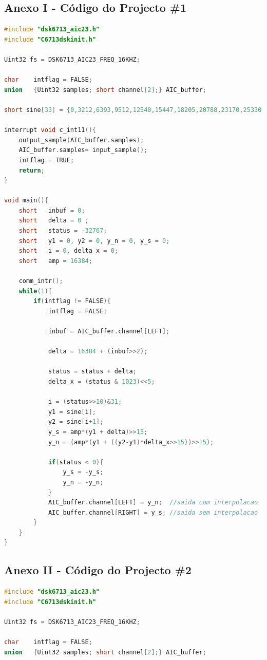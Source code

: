 \documentclass[11pt]{article}
\numberwithin{equation}{section}
\begin{document}
{\subsection{Anexo I - Código do Projecto \#1}

\begin{lstlisting}[language=C]
#include "dsk6713_aic23.h"
#include "C6713dskinit.h"

Uint32 fs = DSK6713_AIC23_FREQ_16KHZ;

char	intflag = FALSE;
union	{Uint32 samples; short channel[2];} AIC_buffer;

short sine[33] = {0,3212,6393,9512,12540,15447,18205,20788,23170,25330,27246,28899,30274,31357,		32138,32610,32767,32610,32138,31357,30274,28899,27246,25330,23170,20788,18205,	15447,12540,9512,6393,3212,0}; 

interrupt void c_int11(){                  	
	output_sample(AIC_buffer.samples); 
	AIC_buffer.samples= input_sample(); 
	intflag = TRUE;
	return;
}

void main(){
	short	inbuf = 0;
	short	delta = 0 ;
	short	status = -32767;
	short	y1 = 0, y2 = 0, y_n = 0, y_s = 0;
	short	i = 0, delta_x = 0;
	short	amp = 16384;
	
	comm_intr();
	while(1){
		if(intflag != FALSE){
			intflag = FALSE;
				
			inbuf = AIC_buffer.channel[LEFT];
			
			delta = 16384 + (inbuf>>2);
			
			status = status + delta;
			delta_x = (status & 1023)<<5;
			
			i = (status>>10)&31;
			y1 = sine[i];
			y2 = sine[i+1];
			y_s = amp*(y1 + delta)>>15;  
			y_n = (amp*(y1 + ((y2-y1)*delta_x>>15))>>15);
			
			if(status < 0){
				y_s = -y_s;
				y_n = -y_n;
			}
			AIC_buffer.channel[LEFT] = y_n;  //saida com interpolacao
			AIC_buffer.channel[RIGHT] = y_s; //saida sem interpolacao
		}
	}
}
\end{lstlisting}

\subsection{Anexo II - Código do Projecto \#2}

\begin{lstlisting}[language=C]
#include "dsk6713_aic23.h"	
#include "C6713dskinit.h"

Uint32 fs = DSK6713_AIC23_FREQ_16KHZ;	

char	intflag = FALSE;
union	{Uint32 samples; short channel[2];} AIC_buffer;


\end{lstlisting}}
\end{document}
